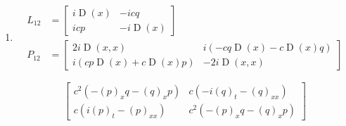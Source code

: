 \documentclass{article}
\begin{document}
\begin{enumerate}
                \item
                \begin{align}
                L_{12} &= \left[\begin{matrix}i \operatorname{D}\left(x\right) & - i c q\\i c p & - i \operatorname{D}\left(x\right)\end{matrix}\right] \\
                P_{12} &= \left[\begin{matrix}2 i \operatorname{D}\left(x, x\right) & i \left(- c q \operatorname{D}\left(x\right) - c \operatorname{D}\left(x\right) q\right)\\i \left(c p \operatorname{D}\left(x\right) + c \operatorname{D}\left(x\right) p\right) & - 2 i \operatorname{D}\left(x, x\right)\end{matrix}\right]
                \end{align}
                
                \begin{equation}
                \left[\begin{matrix}c^{2} \left(- (p)_{x} q - (q)_{x} p\right) & c \left(- i (q)_{t} - (q)_{xx}\right)\\c \left(i (p)_{t} - (p)_{xx}\right) & c^{2} \left(- (p)_{x} q - (q)_{x} p\right)\end{matrix}\right]
                \end{equation}
            
\end{enumerate}
\end{document}
